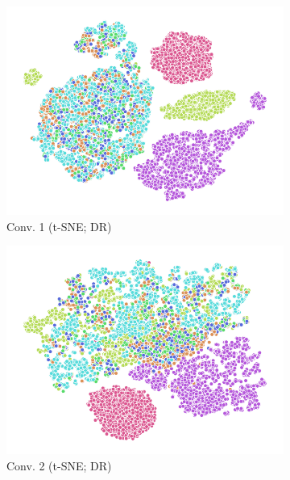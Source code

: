 \begin{figure}
  \begin{subfigure}{0.22\textwidth}
    \includegraphics[width=\textwidth]{figures/chapter6/embeddings/jaco_DR_prop_conv1_tSNE.png}
    \caption{Conv. 1 (t-SNE; DR)}
  \end{subfigure}
  \begin{subfigure}{0.22\textwidth}
    \includegraphics[width=\textwidth]{figures/chapter6/embeddings/jaco_DR_prop_conv2_tSNE.png}
    \caption{Conv. 2 (t-SNE; DR)}
  \end{subfigure}
  \begin{subfigure}{0.22\textwidth}

\end{subfigure}
\end{figure}
